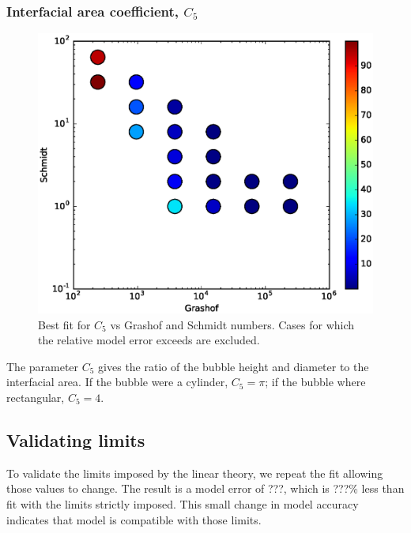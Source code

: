 \subsubsection{Interfacial area coefficient, $C_5$}
\begin{figure}
\includegraphics[width=\columnwidth]{figs/C5-vs-Gr-Sc}
\caption{ 
  Best fit for $C_5$ vs Grashof and Schmidt numbers.
  Cases for which the relative model error exceeds \fittol are excluded.
}
\end{figure}



The parameter $C_5$ gives the ratio of the bubble height and diameter to the interfacial area.
If the bubble were a cylinder, $C_5 = \pi$; if the bubble where rectangular, $C_5 = 4$.


\subsection{Validating limits}
To validate the limits imposed by the linear theory, we repeat the fit allowing those values to change.
The result is a model error of ???, which is ???\% less than fit with the limits strictly imposed.
This small change in model accuracy indicates that model is compatible with those limits.


